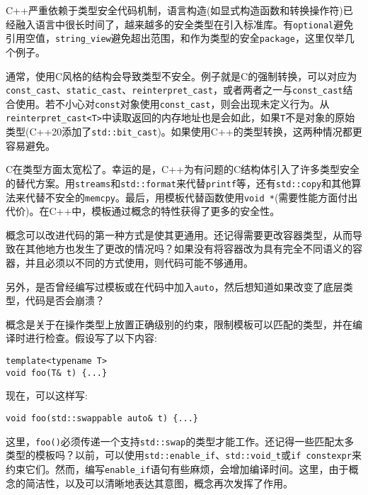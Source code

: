 
C++严重依赖于类型安全代码机制，语言构造(如显式构造函数和转换操作符)已经融入语言中很长时间了，越来越多的安全类型在引入标准库。有\texttt{optional}避免引用空值，\texttt{string\_view}避免超出范围，和作为类型的安全\texttt{package}，这里仅举几个例子。

通常，使用C风格的结构会导致类型不安全。例子就是C的强制转换，可以对应为\texttt{const\_cast}、\texttt{static\_cast}、\texttt{reinterpret\_cast}，或者两者之一与\texttt{const\_cast}结合使用。若不小心对\texttt{const}对象使用\texttt{const\_cast}，则会出现未定义行为。从\texttt{reinterpret\_cast<T>}中读取返回的内存地址也是会如此，如果\texttt{T}不是对象的原始类型(C++20添加了\texttt{std::bit\_cast})。如果使用C++的类型转换，这两种情况都更容易避免。

C在类型方面太宽松了。幸运的是，C++为有问题的C结构体引入了许多类型安全的替代方案。用\texttt{streams}和\texttt{std::format}来代替\texttt{printf}等，还有\texttt{std::copy}和其他算法来代替不安全的\texttt{memcpy}。最后，用模板代替函数使用\texttt{void *}(需要性能方面付出代价)。在C++中，模板通过概念的特性获得了更多的安全性。


概念可以改进代码的第一种方式是使其更通用。还记得需要更改容器类型，从而导致在其他地方也发生了更改的情况吗？如果没有将容器改为具有完全不同语义的容器，并且必须以不同的方式使用，则代码可能不够通用。

另外，是否曾经编写过模板或在代码中加入\texttt{auto}，然后想知道如果改变了底层类型，代码是否会崩溃？

概念是关于在操作类型上放置正确级别的约束，限制模板可以匹配的类型，并在编译时进行检查。假设写了以下内容:

\begin{lstlisting}[style=styleCXX]
template<typename T>
void foo(T& t) {...}
\end{lstlisting}

现在，可以这样写:

\begin{lstlisting}[style=styleCXX]
void foo(std::swappable auto& t) {...}
\end{lstlisting}

这里，\texttt{foo()}必须传递一个支持\texttt{std::swap}的类型才能工作。还记得一些匹配太多类型的模板吗？以前，可以使用\texttt{std::enable\_if}、\texttt{std::void\_t}或\texttt{if constexpr}来约束它们。然而，编写\texttt{enable\_if}语句有些麻烦，会增加编译时间。这里，由于概念的简洁性，以及可以清晰地表达其意图，概念再次发挥了作用。

